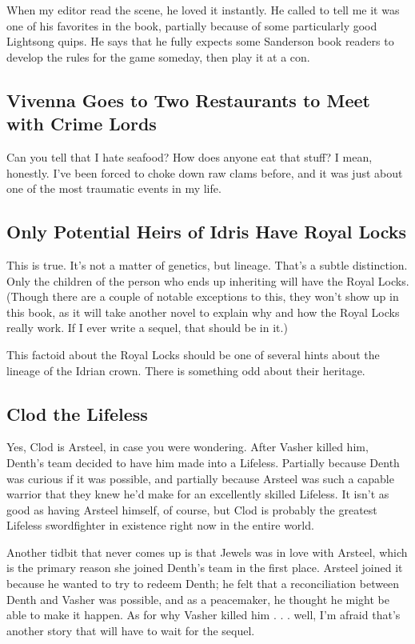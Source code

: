When my editor read the scene, he loved it instantly. He called to tell me it was one of his favorites in the book, partially because of some particularly good Lightsong quips. He says that he fully expects some Sanderson book readers to develop the rules for the game someday, then play it at a con.



\subsection*{Vivenna Goes to Two Restaurants to Meet with Crime Lords}

Can you tell that I hate seafood? How does anyone eat that stuff? I mean, honestly. I’ve been forced to choke down raw clams before, and it was just about one of the most traumatic events in my life.

\subsection*{Only Potential Heirs of Idris Have Royal Locks}

This is true. It’s not a matter of genetics, but lineage. That’s a subtle distinction. Only the children of the person who ends up inheriting will have the Royal Locks. (Though there are a couple of notable exceptions to this, they won’t show up in this book, as it will take another novel to explain why and how the Royal Locks really work. If I ever write a sequel, that should be in it.)

This factoid about the Royal Locks should be one of several hints about the lineage of the Idrian crown. There is something odd about their heritage.

\subsection*{Clod the Lifeless}

Yes, Clod is Arsteel, in case you were wondering. After Vasher killed him, Denth’s team decided to have him made into a Lifeless. Partially because Denth was curious if it was possible, and partially because Arsteel was such a capable warrior that they knew he’d make for an excellently skilled Lifeless. It isn’t as good as having Arsteel himself, of course, but Clod is probably the greatest Lifeless swordfighter in existence right now in the entire world.

Another tidbit that never comes up is that Jewels was in love with Arsteel, which is the primary reason she joined Denth’s team in the first place. Arsteel joined it because he wanted to try to redeem Denth; he felt that a reconciliation between Denth and Vasher was possible, and as a peacemaker, he thought he might be able to make it happen. As for why Vasher killed him . . . well, I’m afraid that’s another story that will have to wait for the sequel.

